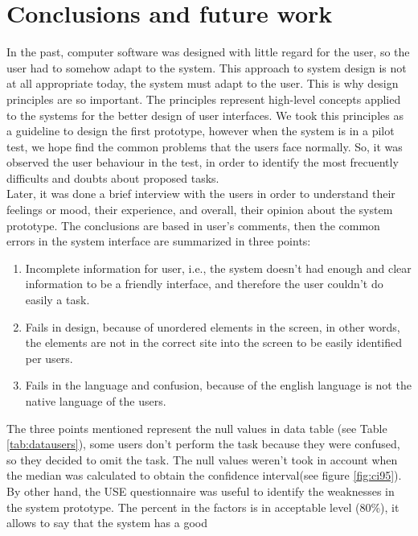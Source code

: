 \chapter{Conclusions and future work} \label{conclusions}

In the past, computer software was designed with little regard for the
user, so the user had to somehow adapt to the system. This approach to
system design is not at all appropriate today, the system must adapt
to the user. This is why design principles\cite{gong2004guidelines} 
are so important. The principles represent high-level concepts 
applied to the systems for the better design of user interfaces. 
We took this principles as a guideline to design the first prototype, 
however  when the system is in a pilot test, we hope find the 
common problems that the users face normally.
So, it was observed the user behaviour in the test, in order to identify
the most frecuently difficults and doubts about proposed tasks.\\ 
Later, it was done a brief interview with the users in order to 
understand their feelings or mood, their
experience, and overall, their opinion about the system prototype.  
The conclusions are based in user's comments, then the common errors 
in the system interface are summarized in three points:
\begin{enumerate}  
\item  Incomplete information for user, i.e., the system doesn't had
enough and clear information to be a friendly interface, and
therefore the user couldn't do easily a task.
\item Fails in design, because of unordered elements in the screen, 
in other words, the elements are not in the correct site into the 
screen to be easily identified per users.
\item Fails in the language and confusion, because of the english 
language is not the native language of the users.
\end{enumerate}
The three points mentioned represent the null values in data
table (see Table \ref{tab:datausers}), some users don't perform the task
because they were confused, so they decided to omit the task. The null
values weren't took in account when the median was calculated to obtain the
confidence interval(see figure \ref{fig:ci95}).\\  
By other hand, the USE questionnaire was useful to identify the
weaknesses in the system prototype. The percent in the factors is in
acceptable level (80\%), it allows to say that the system has a good

